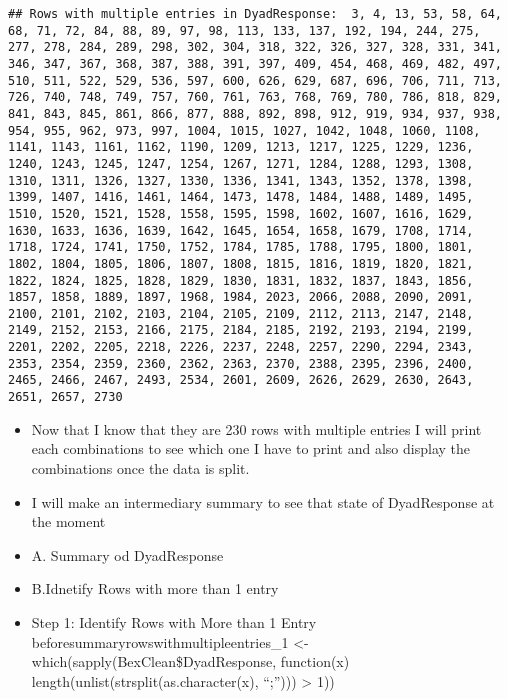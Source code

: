 \documentclass[
]{article}
\begin{document}
\begin{verbatim}
## Rows with multiple entries in DyadResponse:  3, 4, 13, 53, 58, 64, 68, 71, 72, 84, 88, 89, 97, 98, 113, 133, 137, 192, 194, 244, 275, 277, 278, 284, 289, 298, 302, 304, 318, 322, 326, 327, 328, 331, 341, 346, 347, 367, 368, 387, 388, 391, 397, 409, 454, 468, 469, 482, 497, 510, 511, 522, 529, 536, 597, 600, 626, 629, 687, 696, 706, 711, 713, 726, 740, 748, 749, 757, 760, 761, 763, 768, 769, 780, 786, 818, 829, 841, 843, 845, 861, 866, 877, 888, 892, 898, 912, 919, 934, 937, 938, 954, 955, 962, 973, 997, 1004, 1015, 1027, 1042, 1048, 1060, 1108, 1141, 1143, 1161, 1162, 1190, 1209, 1213, 1217, 1225, 1229, 1236, 1240, 1243, 1245, 1247, 1254, 1267, 1271, 1284, 1288, 1293, 1308, 1310, 1311, 1326, 1327, 1330, 1336, 1341, 1343, 1352, 1378, 1398, 1399, 1407, 1416, 1461, 1464, 1473, 1478, 1484, 1488, 1489, 1495, 1510, 1520, 1521, 1528, 1558, 1595, 1598, 1602, 1607, 1616, 1629, 1630, 1633, 1636, 1639, 1642, 1645, 1654, 1658, 1679, 1708, 1714, 1718, 1724, 1741, 1750, 1752, 1784, 1785, 1788, 1795, 1800, 1801, 1802, 1804, 1805, 1806, 1807, 1808, 1815, 1816, 1819, 1820, 1821, 1822, 1824, 1825, 1828, 1829, 1830, 1831, 1832, 1837, 1843, 1856, 1857, 1858, 1889, 1897, 1968, 1984, 2023, 2066, 2088, 2090, 2091, 2100, 2101, 2102, 2103, 2104, 2105, 2109, 2112, 2113, 2147, 2148, 2149, 2152, 2153, 2166, 2175, 2184, 2185, 2192, 2193, 2194, 2199, 2201, 2202, 2205, 2218, 2226, 2237, 2248, 2257, 2290, 2294, 2343, 2353, 2354, 2359, 2360, 2362, 2363, 2370, 2388, 2395, 2396, 2400, 2465, 2466, 2467, 2493, 2534, 2601, 2609, 2626, 2629, 2630, 2643, 2651, 2657, 2730
\end{verbatim}

\begin{itemize}
\item
  Now that I know that they are 230 rows with multiple entries I will
  print each combinations to see which one I have to print and also
  display the combinations once the data is split.
\item
  I will make an intermediary summary to see that state of DyadResponse
  at the moment
\item
  A. Summary od DyadResponse
\item
  B.Idnetify Rows with more than 1 entry
\item
  Step 1: Identify Rows with More than 1 Entry
  beforesummaryrowswithmultipleentries\_1 \textless-
  which(sapply(BexClean\$DyadResponse, function(x)
  length(unlist(strsplit(as.character(x), ``;''))) \textgreater{} 1))
\end{itemize}
\end{document}
